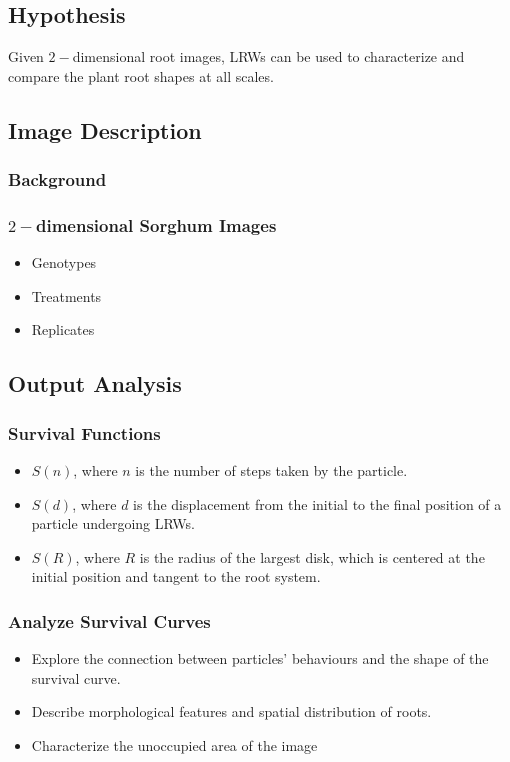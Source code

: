 
  \subsection{Hypothesis}
   \par
   Given $2-$dimensional root images, LRWs can be used to characterize and compare the plant root shapes at all scales.
  
  \subsection{Image Description}
   
     \subsubsection{Background}
     \subsubsection{$2-$dimensional Sorghum Images}
       \begin{itemize}
         \item Genotypes
         \item Treatments
         \item Replicates
       \end{itemize}
       
    
  \subsection{Output Analysis}
     \subsubsection{Survival Functions}
       \begin{itemize}
         \item $S(n)$, where $n$ is the number of steps taken by the particle.
         \item $S(d)$, where $d$ is the displacement from the initial to the final position of a particle undergoing LRWs.
         \item $S(R)$, where $R$ is the radius of the largest disk, which is centered at the initial position and tangent to the root system.
       \end{itemize}
       
      
     \subsubsection{Analyze Survival Curves}
        \begin{itemize}  
          \item Explore the connection between particles' behaviours and the shape of the survival curve.
          \item Describe morphological features and spatial distribution of roots.
          \item Characterize the unoccupied area of the image
        \end{itemize}
        

